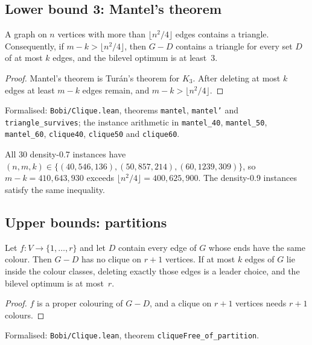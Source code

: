 \subsection{Lower bound 3: Mantel's theorem}

\begin{theorem}\label{thm:mantel}
A graph on $n$ vertices with more than $\lfloor n^2/4\rfloor$ edges contains a
triangle. Consequently, if $m-k>\lfloor n^2/4\rfloor$, then $G-D$ contains a
triangle for every set $D$ of at most $k$ edges, and the bilevel optimum is
at least~$3$.
\end{theorem}
\begin{proof}
Mantel's theorem\cite{mantel1907problem} is Tur\'an's theorem\cite{turan1941extremal}
for $K_3$. After deleting at most $k$
edges at least $m-k$ edges remain, and $m-k>\lfloor n^2/4\rfloor$.
\end{proof}
{\raggedright\noindent Formalised: \texttt{Bobi/Clique.lean}, theorems \texttt{mantel},
\texttt{mantel'} and \texttt{triangle\_survives}; the instance arithmetic in
\texttt{mantel\_40}, \texttt{mantel\_50}, \texttt{mantel\_60},
\texttt{clique40}, \texttt{clique50} and \texttt{clique60}.\par}

All 30 density-0.7 instances have $(n,m,k)\in\{(40,546,136),(50,857,214),(60,1239,309)\}$,
so $m-k=410,643,930$ exceeds $\lfloor n^2/4\rfloor=400,625,900$. The density-0.9
instances satisfy the same inequality.

\subsection{Upper bounds: partitions}

\begin{proposition}\label{prop:clique-partition}
Let $f:V\to\{1,\dots,r\}$ and let $D$ contain every edge of $G$ whose ends have
the same colour. Then $G-D$ has no clique on $r+1$ vertices. If at most $k$
edges of $G$ lie inside the colour classes, deleting exactly those edges is a
leader choice, and the bilevel optimum is at most~$r$.
\end{proposition}
\begin{proof}
$f$ is a proper colouring of $G-D$, and a clique on $r+1$ vertices needs
$r+1$ colours.
\end{proof}
{\raggedright\noindent Formalised: \texttt{Bobi/Clique.lean}, theorem
\texttt{cliqueFree\_of\_partition}.\par}

